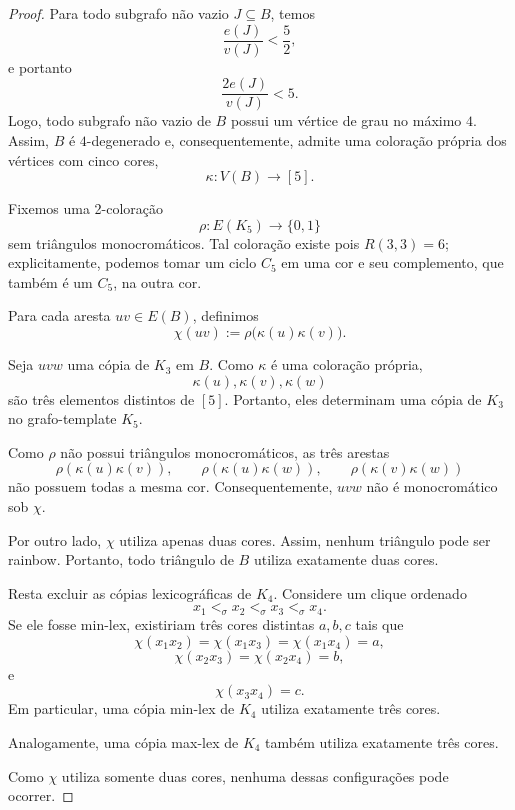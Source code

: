 \documentclass[reqno, 12pt]{amsart}
\numberwithin{equation}{section}
\theoremstyle{plain}
\theoremstyle{definition}
\begin{document}
\begin{proof}
  Para todo subgrafo não vazio $J\subseteq B$, temos
  \[
    \frac{e(J)}{v(J)}<\frac52,
  \]
  e portanto
  \[
    \frac{2e(J)}{v(J)}<5.
  \]
  Logo, todo subgrafo não vazio de $B$ possui um vértice de
  grau no máximo $4$. Assim, $B$ é $4$-degenerado e,
  consequentemente, admite uma coloração própria dos vértices
  com cinco cores,
  \[
    \kappa:V(B)\longrightarrow[5].
  \]

  Fixemos uma 2-coloração
  \[
    \rho:E(K_5)\longrightarrow\{0,1\}
  \]
  sem triângulos monocromáticos. Tal coloração existe pois
  $R(3,3)=6$; explicitamente, podemos tomar um ciclo $C_5$
  em uma cor e seu complemento, que também é um $C_5$, na
  outra cor.

  Para cada aresta $uv\in E(B)$, definimos
  \[
    \chi(uv)
    :=
    \rho\bigl(\kappa(u)\kappa(v)\bigr).
  \]

  Seja $uvw$ uma cópia de $K_3$ em $B$. Como $\kappa$ é
  uma coloração própria,
  \[
    \kappa(u),\kappa(v),\kappa(w)
  \]
  são três elementos distintos de $[5]$. Portanto, eles
  determinam uma cópia de $K_3$ no grafo-template $K_5$.

  Como $\rho$ não possui triângulos monocromáticos, as três
  arestas
  \[
    \rho(\kappa(u)\kappa(v)),\qquad
    \rho(\kappa(u)\kappa(w)),\qquad
    \rho(\kappa(v)\kappa(w))
  \]
  não possuem todas a mesma cor. Consequentemente, $uvw$ não
  é monocromático sob $\chi$.

  Por outro lado, $\chi$ utiliza apenas duas cores. Assim,
  nenhum triângulo pode ser rainbow. Portanto, todo triângulo
  de $B$ utiliza exatamente duas cores.

  Resta excluir as cópias lexicográficas de $K_4$. Considere
  um clique ordenado
  \[
    x_1<_\sigma x_2<_\sigma x_3<_\sigma x_4.
  \]
  Se ele fosse min-lex, existiriam três cores distintas
  $a,b,c$ tais que
  \[
    \chi(x_1x_2)
    =
    \chi(x_1x_3)
    =
    \chi(x_1x_4)
    =
    a,
  \]
  \[
    \chi(x_2x_3)
    =
    \chi(x_2x_4)
    =
    b,
  \]
  e
  \[
    \chi(x_3x_4)=c.
  \]
  Em particular, uma cópia min-lex de $K_4$ utiliza exatamente
  três cores.

  Analogamente, uma cópia max-lex de $K_4$ também utiliza
  exatamente três cores.

  Como $\chi$ utiliza somente duas cores, nenhuma dessas
  configurações pode ocorrer.
\end{proof}
\end{document}
